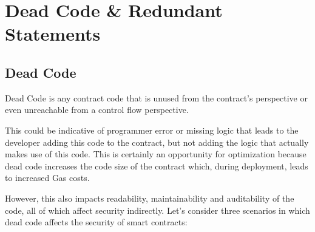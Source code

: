 \section{Dead Code \& Redundant
Statements}\label{dead-code-redundant-statements}

\subsection{Dead Code}\label{dead-code}

Dead Code is any contract code that is unused from the contract's
perspective or even unreachable from a control flow perspective.

This could be indicative of programmer error or missing logic that leads
to the developer adding this code to the contract, but not adding the
logic that actually makes use of this code. This is certainly an
opportunity for optimization because dead code increases the code size
of the contract which, during deployment, leads to increased Gas costs.

However, this also impacts readability, maintainability and auditability
of the code, all of which affect security indirectly. Let's consider
three scenarios in which dead code affects the security of smart
contracts:


